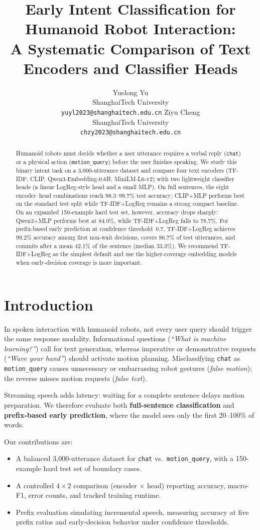 \documentclass{article}
\title{Early Intent Classification for Humanoid Robot Interaction:\\
A Systematic Comparison of Text Encoders and Classifier Heads}
\author{%
  Yuelong Yu \\
  ShanghaiTech University \\
  \texttt{yuyl2023@shanghaitech.edu.cn}
  \And
  Ziyu Cheng \\
  ShanghaiTech University \\
  \texttt{chzy2023@shanghaitech.edu.cn}
}
\begin{document}
\maketitle

\begin{abstract}
Humanoid robots must decide whether a user utterance requires a verbal reply
(\texttt{chat}) or a physical action (\texttt{motion\_query}) before the
user finishes speaking.
We study this binary intent task on a 3{,}000-utterance dataset and compare
four text encoders (TF-IDF, CLIP, Qwen3-Embedding-0.6B, MiniLM-L6-v2)
with two lightweight classifier heads (a linear LogReg-style head and a small
MLP).
On full sentences, the eight encoder--head combinations reach 98.3--99.7\%
test accuracy; CLIP+MLP performs best on the standard test split while
TF-IDF+LogReg remains a strong compact baseline.
On an expanded 150-example hard test set, however, accuracy drops sharply:
Qwen3+MLP performs best at 84.0\%, while TF-IDF+LogReg falls to 78.7\%.
For prefix-based early prediction at confidence threshold~0.7, TF-IDF+LogReg
achieves 99.2\% accuracy among first non-wait decisions, covers 86.7\% of test
utterances, and commits after a mean 42.1\% of the sentence (median 33.3\%).
We recommend TF-IDF+LogReg as the simplest default and use the higher-coverage
embedding models when early-decision coverage is more important.
\end{abstract}

\section{Introduction}

In spoken interaction with humanoid robots, not every user query should trigger
the same response modality.
Informational questions (\emph{``What is machine learning?''}) call for
text generation, whereas imperative or demonstrative requests
(\emph{``Wave your hand''}) should activate motion planning.
Misclassifying \texttt{chat} as \texttt{motion\_query} causes unnecessary or
embarrassing robot gestures (\emph{false motion}); the reverse misses motion
requests (\emph{false text}).

Streaming speech adds latency: waiting for a complete sentence delays motion
preparation.
We therefore evaluate both \textbf{full-sentence classification} and
\textbf{prefix-based early prediction}, where the model sees only the first
20--100\% of words.

Our contributions are:
\begin{itemize}
  \item A balanced 3{,}000-utterance dataset for \texttt{chat} vs.\
        \texttt{motion\_query}, with a 150-example hard test set of boundary
        cases.
  \item A controlled $4 \times 2$ comparison (encoder $\times$ head) reporting
        accuracy, macro-F1, error counts, and tracked training runtime.
  \item Prefix evaluation simulating incremental speech, measuring accuracy at
        five prefix ratios and early-decision behavior under confidence
        thresholds.
\end{itemize}
\end{document}
